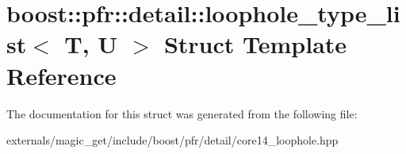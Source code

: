 \hypertarget{structboost_1_1pfr_1_1detail_1_1loophole__type__list}{}\section{boost\+:\+:pfr\+:\+:detail\+:\+:loophole\+\_\+type\+\_\+list$<$ T, U $>$ Struct Template Reference}
\label{structboost_1_1pfr_1_1detail_1_1loophole__type__list}


The documentation for this struct was generated from the following file\+:\begin{DoxyCompactItemize}
\item 
externals/magic\+\_\+get/include/boost/pfr/detail/core14\+\_\+loophole.\+hpp\end{DoxyCompactItemize}
